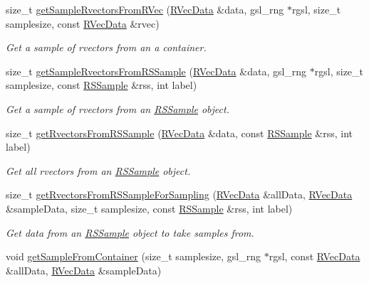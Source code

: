\begin{DoxyCompactItemize}
size\-\_\-t \hyperlink{namespacesubpavings_ad2d24521f44422db117d54d6287bc314}{get\-Sample\-Rvectors\-From\-R\-Vec} (\hyperlink{namespacesubpavings_a30e15e24c8d81a2160d7422ef3c39d68}{\-R\-Vec\-Data} \&data, gsl\-\_\-rng $\ast$rgsl, size\-\_\-t samplesize, const \hyperlink{namespacesubpavings_a30e15e24c8d81a2160d7422ef3c39d68}{\-R\-Vec\-Data} \&rvec)
\begin{DoxyCompactList}\small\item\em \-Get a sample of rvectors from an a container. \end{DoxyCompactList}\item 
size\-\_\-t \hyperlink{namespacesubpavings_ae988c56fd983d75dd9f60a5ef8f87660}{get\-Sample\-Rvectors\-From\-R\-S\-Sample} (\hyperlink{namespacesubpavings_a30e15e24c8d81a2160d7422ef3c39d68}{\-R\-Vec\-Data} \&data, gsl\-\_\-rng $\ast$rgsl, size\-\_\-t samplesize, const \hyperlink{classRSSample}{\-R\-S\-Sample} \&rss, int label)
\begin{DoxyCompactList}\small\item\em \-Get a sample of rvectors from an \hyperlink{classRSSample}{\-R\-S\-Sample} object. \end{DoxyCompactList}\item 
size\-\_\-t \hyperlink{namespacesubpavings_ad435f1951db3078702d178b718018651}{get\-Rvectors\-From\-R\-S\-Sample} (\hyperlink{namespacesubpavings_a30e15e24c8d81a2160d7422ef3c39d68}{\-R\-Vec\-Data} \&data, const \hyperlink{classRSSample}{\-R\-S\-Sample} \&rss, int label)
\begin{DoxyCompactList}\small\item\em \-Get all rvectors from an \hyperlink{classRSSample}{\-R\-S\-Sample} object. \end{DoxyCompactList}\item 
size\-\_\-t \hyperlink{namespacesubpavings_ad26b1f7572cd78c11b5f9a423a80a258}{get\-Rvectors\-From\-R\-S\-Sample\-For\-Sampling} (\hyperlink{namespacesubpavings_a30e15e24c8d81a2160d7422ef3c39d68}{\-R\-Vec\-Data} \&all\-Data, \hyperlink{namespacesubpavings_a30e15e24c8d81a2160d7422ef3c39d68}{\-R\-Vec\-Data} \&sample\-Data, size\-\_\-t samplesize, const \hyperlink{classRSSample}{\-R\-S\-Sample} \&rss, int label)
\begin{DoxyCompactList}\small\item\em \-Get data from an \hyperlink{classRSSample}{\-R\-S\-Sample} object to take samples from. \end{DoxyCompactList}\item 
void \hyperlink{namespacesubpavings_a4605f09553766eb8702c7c58b8074cf2}{get\-Sample\-From\-Container} (size\-\_\-t samplesize, gsl\-\_\-rng $\ast$rgsl, const \hyperlink{namespacesubpavings_a30e15e24c8d81a2160d7422ef3c39d68}{\-R\-Vec\-Data} \&all\-Data, \hyperlink{namespacesubpavings_a30e15e24c8d81a2160d7422ef3c39d68}{\-R\-Vec\-Data} \&sample\-Data)

\end{DoxyCompactItemize}
